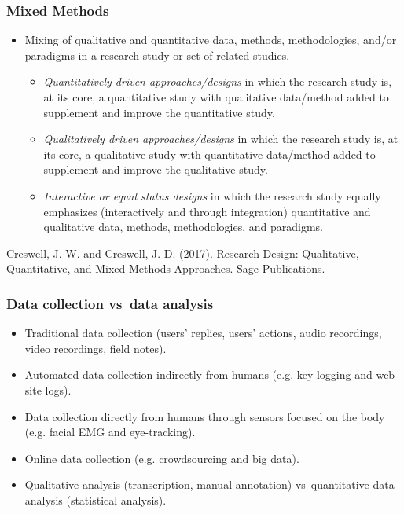 \documentclass[screen, aspectratio=169]{beamer}
\begin{document}
%
\begin{frame}
\frametitle{Mixed Methods}
\begin{itemize}
\item Mixing of qualitative and quantitative data, methods, methodologies, and/or paradigms in a research study or set of related studies.
\begin{itemize}
\item \emph{Quantitatively driven approaches/designs} in which the research study is, at its core, a quantitative study with qualitative data/method added to supplement and improve the quantitative study.
\item \emph{Qualitatively driven approaches/designs} in which the research study is, at its core, a qualitative study with quantitative data/method added to supplement and improve the qualitative study.
\item \emph{Interactive or equal status designs} in which the research study equally emphasizes (interactively and through integration) quantitative and qualitative data, methods, methodologies, and paradigms. 
\end{itemize}
\end{itemize}
Creswell, J. W. and Creswell, J. D. (2017). Research Design: Qualitative, Quantitative, and Mixed Methods Approaches. Sage Publications. \cite{Creswell.2017.research}
\end{frame}
%
\begin{frame}
\frametitle{Data collection vs\ data analysis}
\begin{itemize}
\item Traditional data collection (users' replies, users' actions, audio recordings, video recordings, field notes).
\item Automated data collection indirectly from humans (e.g. key logging and web site logs).
\item Data collection directly from humans through sensors focused on the body (e.g. facial EMG and eye-tracking).
\item Online data collection (e.g. crowdsourcing and big data).
\item Qualitative analysis (transcription, manual annotation) vs\ quantitative data analysis (statistical analysis).
\end{itemize}
\end{frame}
%
\end{document}
